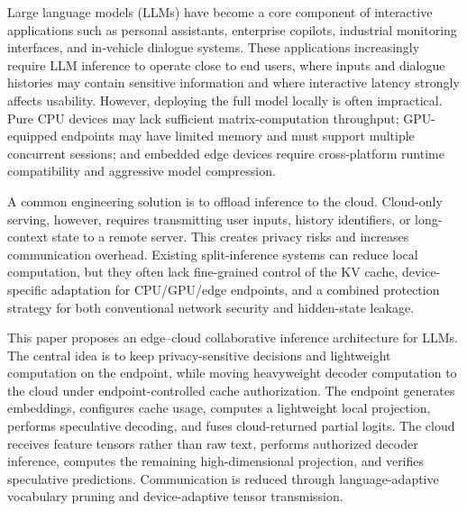 \documentclass{article}
\begin{document}
Large language models (LLMs) have become a core component of interactive applications such as personal assistants, enterprise copilots, industrial monitoring interfaces, and in-vehicle dialogue systems. These applications increasingly require LLM inference to operate close to end users, where inputs and dialogue histories may contain sensitive information and where interactive latency strongly affects usability. However, deploying the full model locally is often impractical. Pure CPU devices may lack sufficient matrix-computation throughput; GPU-equipped endpoints may have limited memory and must support multiple concurrent sessions; and embedded edge devices require cross-platform runtime compatibility and aggressive model compression.

A common engineering solution is to offload inference to the cloud. Cloud-only serving, however, requires transmitting user inputs, history identifiers, or long-context state to a remote server. This creates privacy risks and increases communication overhead. Existing split-inference systems can reduce local computation, but they often lack fine-grained control of the KV cache, device-specific adaptation for CPU/GPU/edge endpoints, and a combined protection strategy for both conventional network security and hidden-state leakage.

This paper proposes an edge--cloud collaborative inference architecture for LLMs. The central idea is to keep privacy-sensitive decisions and lightweight computation on the endpoint, while moving heavyweight decoder computation to the cloud under endpoint-controlled cache authorization. The endpoint generates embeddings, configures cache usage, computes a lightweight local projection, performs speculative decoding, and fuses cloud-returned partial logits. The cloud receives feature tensors rather than raw text, performs authorized decoder inference, computes the remaining high-dimensional projection, and verifies speculative predictions. Communication is reduced through language-adaptive vocabulary pruning and device-adaptive tensor transmission.
\end{document}
